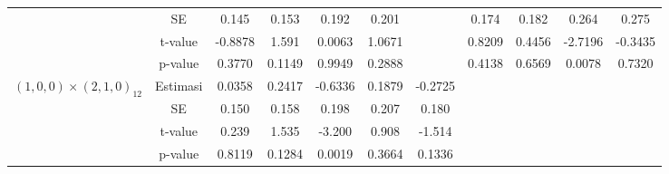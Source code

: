 \begin{enumerate}[label=\alph*.]
\begin{longtable}{|c|c|c|c|c|c|c|c|c|c|c|}
            & SE
            & {0.145} & {0.153}
            & {0.192} & {0.201} & {}
            & {0.174} & {0.182}
            & {0.264} & {0.275} \\ \cline{2-11}

            & t-value
            & {-0.8878} & {1.591}
            & {0.0063} & {1.0671} & {}
            & {0.8209} & {0.4456}
            & {-2.7196} & {-0.3435} \\ \cline{2-11}

            & p-value
            & {0.3770} & {0.1149}
            & {0.9949} & {0.2888} & {}
            & {0.4138} & {0.6569}
            & {0.0078} & {0.7320} \\ \hline

            \multirow{4}{*}{$(1,0,0)\times(2,1,0)_{12}$}
            & Estimasi
            & {0.0358} & {0.2417}
            & {-0.6336} & {0.1879} & {-0.2725}
            & {} & {}
            & {} & {} \\ \cline{2-11}

            & SE
            & {0.150} & {0.158}
            & {0.198} & {0.207} & {0.180}
            & {} & {}
            & {} & {} \\ \cline{2-11}

            & t-value
            & {0.239} & {1.535}
            & {-3.200} & {0.908} & {-1.514}
            & {} & {}
            & {} & {} \\ \cline{2-11}

            & p-value
            & {0.8119} & {0.1284}
            & {0.0019} & {0.3664} & {0.1336}
            & {} & {}
            & {} & {} \\ \hline

        \end{longtable}
        \normalsize
\end{enumerate}